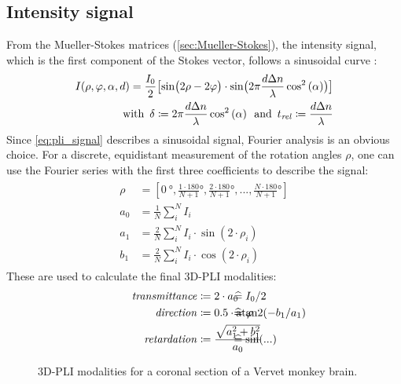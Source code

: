 \subsection{Intensity signal}
%
From the Mueller-Stokes matrices (\cref{sec:Mueller-Stokes}), the intensity signal, which is the first component of the Stokes vector, follows a sinusoidal curve \cite{MenzelMaster,MenzelDissertation}:
%
\begin{align}
\label{eq:pli_signal}
\begin{split}
I(\rho, \varphi, \alpha, d) =\frac{I_0}{2}\bigl[ \sin\bigl(2\rho - 2\varphi \bigr)\cdot \sin \bigl( 2\pi\frac{d \textnormal{$\Delta n$}}{\lambda} \cos^2\left( \alpha \right) \bigr) \bigr] \\
\text{with} \enspace \delta \coloneqq 2\pi\frac{d \textnormal{$\Delta n$}}{\lambda} \cos^2\left( \alpha \right) \enspace
\text{and} \enspace \textnormal{$t_\mathit{rel}$} \coloneqq \frac{d \textnormal{$\Delta n$}}{\lambda}
\end{split}
\end{align}
%
Since \cref{eq:pli_signal} describes a sinusoidal signal, Fourier analysis is an obvious choice.
For a discrete, equidistant measurement of the rotation angles $\rho$, one can use the Fourier series with the first three coefficients to describe the signal:
%
\begin{align}
\begin{split}
\rho &= [\SI{0}{\degree}, \frac{1\cdot180}{N+1}\si{\degree}, \frac{2\cdot180}{N+1}\si{\degree}, ..., \frac{N\cdot180}{N+1}\si{\degree}]\\
a_0 &= \frac{1}{N} \sum_i^N I_i\\
a_1 &= \frac{2}{N} \sum_i^N I_i \cdot \sin(2 \cdot \rho_i)\\
b_1 &= \frac{2}{N} \sum_i^N I_i \cdot \cos(2 \cdot \rho_i)
\end{split}
\end{align}
%
These are used to calculate the final \ac{3D-PLI} modalities:
%
\begin{align}
\begin{split}
\mathit{transmittance} &\coloneqq 2 \cdot a_0 \vphantom{I_0/2} \\
\mathit{direction} &\coloneqq 0.5 \cdot \atantwo(-b_1 / a_1) \vphantom{\varphi} \\
\mathit{retardation} &\coloneqq \frac{\sqrt{a_1^2 + b_1^2}}{a_0}  \vphantom{\sin(...)}
\end{split}
\hspace{-7em}
\begin{split}
& \mathrel{\widehat{=}} I_0/2 \vphantom{2 \cdot a_0}\\
& \mathrel{\widehat{=}} \varphi \vphantom{0.5 \cdot \atantwo(-b_1 / a_1)} \\
& \mathrel{\widehat{=}} \sin(...) \vphantom{\frac{\sqrt{a_1^2 + b_1^2}}{a_0}}
\end{split}
\end{align}
%
%
\begin{figure}[t]

\caption[3D-PLI modalities]{3D-PLI modalities for a coronal section of a Vervet monkey brain.}
\end{figure}
%
%
